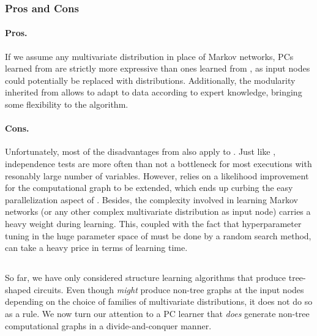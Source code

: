 \subsubsection{Pros and Cons}

\paragraph{Pros.} If we assume any multivariate distribution in place of Markov networks, PCs
learned from  are strictly more expressive than ones learned from
, as input nodes could potentially be replaced with 
distributions. Additionally, the modularity inherited from  allows
 to adapt to data according to expert knowledge, bringing some flexibility to the
algorithm.

\paragraph{Cons.} Unfortunately, most of the disadvantages from  also apply to
. Just like , independence tests are more often than not a
bottleneck for most executions with resonably large number of variables. However, 
relies on a likelihood improvement for the computational graph to be extended, which ends up
curbing the easy parallelization aspect of . Besides, the complexity involved in
learning Markov networks (or any other complex multivariate distribution as input node) carries a
heavy weight during learning. This, coupled with the fact that hyperparameter tuning in the huge
parameter space of  must be done by a random search method, can take a heavy price
in terms of learning time.

\subsection{}

So far, we have only considered structure learning algorithms that produce tree-shaped circuits.
Even though  \emph{might} produce non-tree graphs at the input nodes depending on
the choice of families of multivariate distributions, it does not do so as a rule. We now turn our
attention to a PC learner that \emph{does} generate non-tree computational graphs in a
divide-and-conquer manner.

